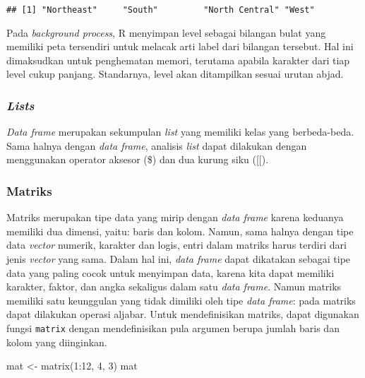 \documentclass[
]{article}
\newenvironment{Shaded}{\begin{snugshade}}{\end{snugshade}}
\newcommand{\DecValTok}[1]{\textcolor[rgb]{0.00,0.00,0.81}{#1}}
\newcommand{\FunctionTok}[1]{\textcolor[rgb]{0.00,0.00,0.00}{#1}}
\newcommand{\NormalTok}[1]{#1}
\newcommand{\OtherTok}[1]{\textcolor[rgb]{0.56,0.35,0.01}{#1}}
\newcommand{\SpecialCharTok}[1]{\textcolor[rgb]{0.00,0.00,0.00}{#1}}
\begin{document}
\begin{Shaded}
\end{Shaded}

\begin{verbatim}
## [1] "Northeast"     "South"         "North Central" "West"
\end{verbatim}

Pada \emph{background process}, R menyimpan level sebagai bilangan bulat
yang memiliki peta tersendiri untuk melacak arti label dari bilangan
tersebut. Hal ini dimaksudkan untuk penghematan memori, terutama apabila
karakter dari tiap level cukup panjang. Standarnya, level akan
ditampilkan sesuai urutan abjad.

\hypertarget{lists}{%
\subsubsection{\texorpdfstring{\emph{Lists}}{Lists}}\label{lists}}

\emph{Data frame} merupakan sekumpulan \emph{list} yang memiliki kelas
yang berbeda-beda. Sama halnya dengan \emph{data frame}, analisis
\emph{list} dapat dilakukan dengan menggunakan operator aksesor (\$) dan
dua kurung siku ({[}{[}).

\hypertarget{matriks}{%
\subsubsection{Matriks}\label{matriks}}

Matriks merupakan tipe data yang mirip dengan \emph{data frame} karena
keduanya memiliki dua dimensi, yaitu: baris dan kolom. Namun, sama
halnya dengan tipe data \emph{vector} numerik, karakter dan logis, entri
dalam matriks harus terdiri dari jenis \emph{vector} yang sama. Dalam
hal ini, \emph{data frame} dapat dikatakan sebagai tipe data yang paling
cocok untuk menyimpan data, karena kita dapat memiliki karakter, faktor,
dan angka sekaligus dalam satu \emph{data frame}. Namun matriks memiliki
satu keunggulan yang tidak dimiliki oleh tipe \emph{data frame}: pada
matriks dapat dilakukan operasi aljabar. Untuk mendefinisikan matriks,
dapat digunakan fungsi \texttt{matrix} dengan mendefinisikan pula
argumen berupa jumlah baris dan kolom yang diinginkan.

\begin{Shaded}
\begin{Highlighting}[]
\NormalTok{mat }\OtherTok{\textless{}{-}} \FunctionTok{matrix}\NormalTok{(}\DecValTok{1}\SpecialCharTok{:}\DecValTok{12}\NormalTok{, }\DecValTok{4}\NormalTok{, }\DecValTok{3}\NormalTok{) }
\NormalTok{mat}
\end{Highlighting}
\end{Shaded}
\end{document}

